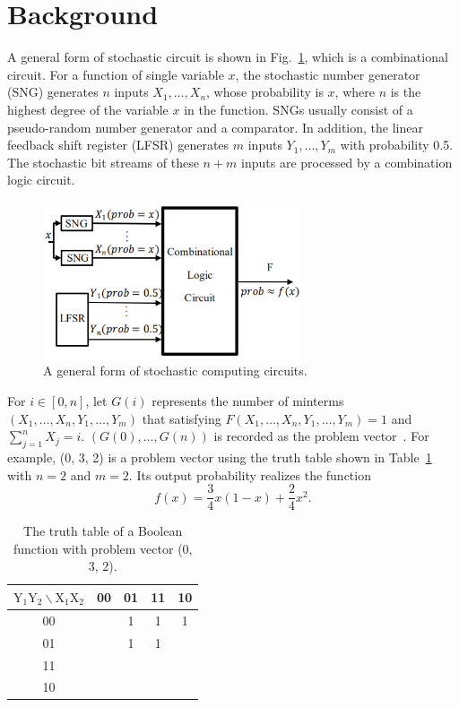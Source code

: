 \documentclass[conference,letterpaper]{IEEEtran}
\begin{document}
\section*{Background}
A general form of stochastic circuit is shown in Fig.~\ref{fig2}, which is a combinational circuit. For a function of single variable $x$, the stochastic number generator (SNG) generates $n$ inputs $X_{1}, \ldots, X_{n}$, whose probability is $x$, where $n$ is the highest degree of the variable $x$ in the function. SNGs usually consist of a pseudo-random number generator and a comparator. In addition, the linear feedback shift register (LFSR) generates $m$ inputs $Y_{1}, \ldots, Y_{m}$ with probability 0.5. The stochastic bit streams of these $n+m$ inputs are processed by a combination logic circuit.

\begin{figure}[t]
	\centering
	\includegraphics[width=3in]{fig/sc.png}	
	\caption{\label{fig2}A general form of stochastic computing circuits.} \vspace{-2ex}
\end{figure}

For $i\in[0,n]$, let $G(i)$ represents the number of minterms $(X_{1}, \ldots, X_{n}, Y_{1}, \ldots, Y_{m})$ that satisfying $F(X_{1}, \ldots, X_{n}, Y_{1}, \ldots, Y_{m})=1$ and $\sum_{j=1}^{n} X_{j}=i$. $(G(0), \ldots, G(n))$ is recorded as the problem vector~\cite{2}. For example, (0, 3, 2) is a problem vector using the truth table shown in Table~\ref{tab:tt} with $n=2$ and $m=2$. Its output probability realizes the function
\begin{equation}
f(x)=\frac{3}{4} x(1-x)+\frac{2}{4} x^{2}.
\end{equation}

\begin{table}[htbp]
\setlength{\abovecaptionskip}{0.cm}
\setlength{\belowcaptionskip}{0.pt}
\setlength{\tabcolsep}{1mm}
\caption{The truth table of a Boolean function with problem vector (0, 3, 2).}
\centering \label{tab:tt}
\begin{tabular}{|c|c|c|c|c|}
\hline $\mathrm{Y}_{1} \mathrm{Y}_{2} \backslash \mathrm{X}_{1} \mathrm{X}_{2}$ & 00 & 01 & 11 & 10 \\
\hline 00 & & 1 & 1 & 1 \\
\hline 01 & & 1 & 1 & \\
\hline 11 & & & & \\
\hline 10 & & & & \\
\hline
\end{tabular}
\end{table}
\end{document}
